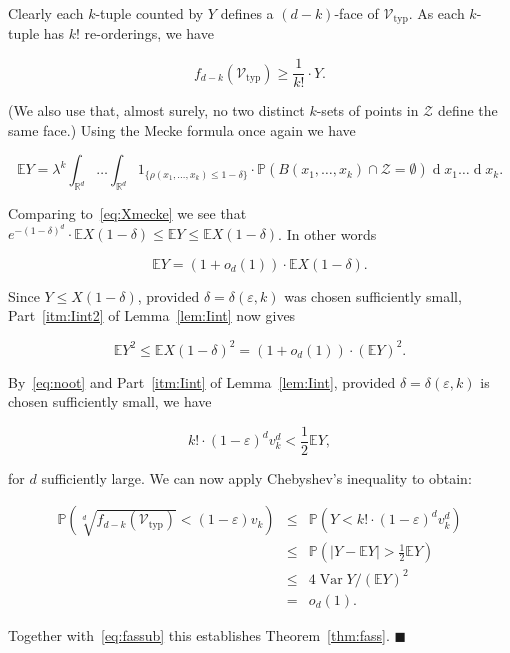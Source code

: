 \documentclass[11pt]{article}%
\newenvironment{proofof}[1]{\vspace{1ex}\noindent{\bf Proof of #1.}}{\hspace*{\fill}$\blacksquare$\vspace{1ex}}
\newcommand{\Vcal}[0]{\ensuremath{{\mathcal V}}}
\newcommand{\Zcal}[0]{\ensuremath{{\mathcal Z}}}
\newcommand{\eR}[0]{\ensuremath{ \mathbb R}}
\newcommand{\Pee}[0]{\ensuremath{{\mathbb P}}}
\newcommand{\Ee}[0]{\ensuremath{{\mathbb E}}}
\newcommand{\eps}{\varepsilon}
\DeclareMathOperator{\dd}{d}
\DeclareMathOperator{\Var}{Var}
\newcommand{\Vtyp}[0]{\Vcal_{\text{typ}}}
\begin{document}
\begin{proofof}{Theorem~\ref{thm:fass}}
\noindent
Clearly each $k$-tuple counted by $Y$ defines a $(d-k)$-face of $\Vtyp$. 
As each $k$-tuple has $k!$ re-orderings, we have

$$ f_{d-k}(\Vtyp) \geq \frac{1}{k!} \cdot Y. $$

\noindent
(We also use that, almost surely, 
no two distinct $k$-sets of points in $\Zcal$ define the same face.)
Using the Mecke formula once again we have 

$$ \Ee Y =
\lambda^k \int_{\eR^d}\dots\int_{\eR^d} 1_{\{\rho(x_1,\dots,x_k) \leq 1-\delta\}} 
\cdot \Pee( B(x_1,\dots,x_k) \cap \Zcal = \emptyset) \dd x_1\dots\dd x_k. $$

\noindent
Comparing to~\eqref{eq:Xmecke} we see that 
$e^{-(1-\delta)^d} \cdot \Ee X(1-\delta) \leq \Ee Y \leq \Ee X(1-\delta)$. 
In other words 

\begin{equation}\label{eq:noot}
\Ee Y = (1+o_d(1)) \cdot \Ee X(1-\delta).
\end{equation}

\noindent
Since $Y \leq X(1-\delta)$, provided $\delta=\delta(\eps,k)$ was chosen sufficiently small, 
Part~\ref{itm:Iint2} of Lemma~\ref{lem:Iint} now gives

$$ \Ee Y^2 \leq \Ee X(1-\delta)^2 = (1+o_d(1)) \cdot \left( \Ee Y \right)^2. $$

\noindent
By~\eqref{eq:noot} and Part~\ref{itm:Iint} of 
Lemma~\ref{lem:Iint}, provided $\delta=\delta(\eps,k)$ is chosen sufficiently small, we have 

$$ k! \cdot (1-\eps)^d v_k^d < \frac{1}{2} \Ee Y, $$

\noindent 
for $d$ sufficiently large.
We can now apply Chebyshev's inequality to obtain:

$$ \begin{array}{rcl} \Pee\left( \sqrt[d]{f_{d-k}(\Vtyp)} < (1-\eps) v_k \right) 
& \leq & \Pee( Y <  k! \cdot (1-\eps)^d v_k^d ) \\
& \leq & \Pee( |Y-\Ee Y| > \frac12 \Ee Y ) \\
& \leq & 4 \Var Y / \left(\Ee Y\right)^2 \\
& = & o_d(1). \end{array} $$

\noindent
Together with~\eqref{eq:fassub} this establishes Theorem~\ref{thm:fass}. 
\end{proofof}
\end{document}
